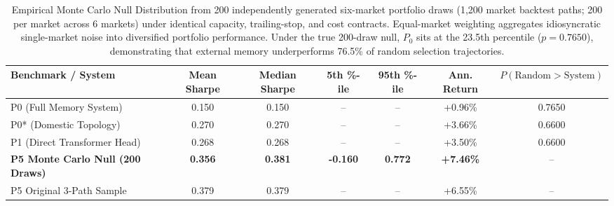 \begin{table}[ht]
\centering
\small
\begin{tabular}{lcccccc}
\toprule
\textbf{Benchmark / System} & \textbf{Mean Sharpe} & \textbf{Median Sharpe} & \textbf{5th \%-ile} & \textbf{95th \%-ile} & \textbf{Ann. Return} & \textbf{$P(\text{Random} > \text{System})$} \\
\midrule
P0 (Full Memory System) & 0.150 & 0.150 & -- & -- & +0.96\% & 0.7650 \\
P0* (Domestic Topology) & 0.270 & 0.270 & -- & -- & +3.66\% & 0.6600 \\
P1 (Direct Transformer Head) & 0.268 & 0.268 & -- & -- & +3.50\% & 0.6600 \\
\midrule
\textbf{P5 Monte Carlo Null (200 Draws)} & \textbf{0.356} & \textbf{0.381} & \textbf{-0.160} & \textbf{0.772} & \textbf{+7.46\%} & -- \\
P5 Original 3-Path Sample & 0.379 & 0.379 & -- & -- & +6.55\% & -- \\
\bottomrule
\end{tabular}
\caption{Empirical Monte Carlo Null Distribution from 200 independently generated six-market portfolio draws (1,200 market backtest paths; 200 per market across 6 markets) under identical capacity, trailing-stop, and cost contracts. Equal-market weighting aggregates idiosyncratic single-market noise into diversified portfolio performance. Under the true 200-draw null, $P_0$ sits at the 23.5th percentile ($p = 0.7650$), demonstrating that external memory underperforms 76.5\% of random selection trajectories.}
\label{tab:random_null_1200_distribution}
\end{table}

